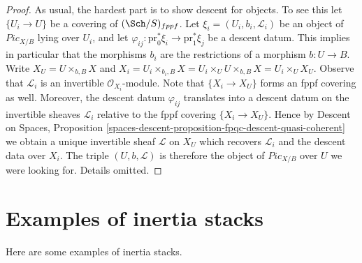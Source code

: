 \begin{proof}
As usual, the hardest part is to show descent for objects.
To see this let $\{U_i \to U\}$ be a covering of $(\Sch/S)_{fppf}$.
Let $\xi_i = (U_i, b_i, \mathcal{L}_i)$ be an object of
$\textit{Pic}_{X/B}$ lying over $U_i$, and let
$\varphi_{ij} : \text{pr}_0^*\xi_i \to \text{pr}_1^*\xi_j$
be a descent datum. This implies in particular that the morphisms
$b_i$ are the restrictions of a morphism $b : U \to B$.
Write $X_U = U \times_{b, B} X$ and
$X_i = U_i \times_{b_i, B} X =
U_i \times_U U \times_{b, B} X = U_i \times_U X_U$.
Observe that $\mathcal{L}_i$ is an invertible $\mathcal{O}_{X_i}$-module.
Note that $\{X_i \to X_U\}$ forms an fppf covering as well.
Moreover, the descent datum $\varphi_{ij}$ translates into a
descent datum on the invertible sheaves $\mathcal{L}_i$ relative
to the fppf covering $\{X_i \to X_U\}$.
Hence by
Descent on Spaces,
Proposition \ref{spaces-descent-proposition-fpqc-descent-quasi-coherent}
we obtain a unique invertible sheaf $\mathcal{L}$ on $X_U$
which recovers $\mathcal{L}_i$ and the descent data over $X_i$.
The triple $(U, b, \mathcal{L})$ is therefore the object of
$\textit{Pic}_{X/B}$ over $U$ we were looking for.
Details omitted.
\end{proof}





\section{Examples of inertia stacks}
\label{section-examples-inertia}

\noindent
Here are some examples of inertia stacks.

